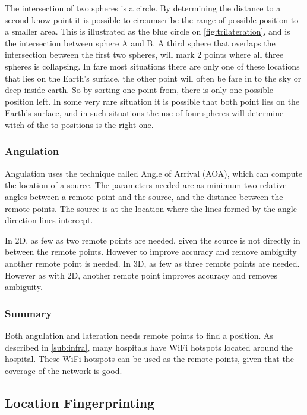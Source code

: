   The intersection of two spheres is a circle. By determining the distance to a second know point it is possible to circumscribe the range of possible position to a smaller area.
  This is illustrated as the blue circle on \cref{fig:trilateration}, and is the intersection between sphere A and B.
  A third sphere that overlaps the intersection between the first two spheres, will mark 2 points where all three spheres is collapsing. In fare most situations there are only one of these locations that lies on the Earth's surface, the other point will often be fare in to the sky or deep inside earth. So by sorting one point from, there is only one possible position left. 
  In some very rare situation it is possible that both point lies on the Earth's surface, and in such situations the use of four spheres will determine witch of the to positions is the right one.



  \subsubsection{Angulation}

  Angulation uses the technique called Angle of Arrival (AOA), which can compute the location of a source. The parameters needed are as minimum two relative angles between a remote point and the source, and the distance between the remote points. The source is at the location where the lines formed by the angle direction lines intercept. 

  In 2D, as few as two remote points are needed, given the source is not directly in between the remote points. However to improve accuracy and remove ambiguity  another remote point is needed. In 3D, as few as three remote points are needed. However as with 2D, another remote point improves accuracy and removes ambiguity. \cite{Liu2007, Sun2009, Boontrai2009}

  \subsubsection{Summary}


  Both angulation and lateration needs remote points to find a position. As described in \cref{sub:infra}, many hospitals have WiFi hotspots located around the hospital. These WiFi hotspots can be used as the remote points, given that the coverage of the network is good.

  \subsection{Location Fingerprinting}

